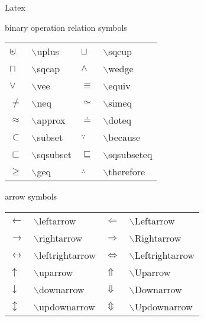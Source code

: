 \begin{section}{Latex}
\begin{subsection}{binary operation relation symbols}
\begin{tabular}{ |m{1cm}|m{3cm}|m{1cm}|m{3cm} | }
			$\uplus$ & $\backslash$uplus &
			$\sqcup$ & $\backslash$sqcup \\
		
			$\sqcap$ & $\backslash$sqcap &
			$\wedge$ & $\backslash$wedge \\
		
			$\vee$ & $\backslash$vee &
			$\equiv$ & $\backslash$equiv \\
		
			$\neq$ & $\backslash$neq &
			$\simeq$ & $\backslash$simeq \\
		
			$\approx$ & $\backslash$approx &
			$\doteq$ & $\backslash$doteq \\
		
			$\subset$ & $\backslash$subset &
			$\because$ & $\backslash$because \\
		
			$\sqsubset$ & $\backslash$sqsubset &
			$\sqsubseteq$ & $\backslash$sqsubseteq \\
		
		
			$\geq$ & $\backslash$geq &
			$\therefore$ & $\backslash$therefore \\
	
		\hline
		\end{tabular}
	
	\end{subsection}

	\begin{subsection}{arrow symbols}
		\begin{tabular}{ |m{1cm}|m{4cm}|m{1cm}|m{4cm} | }
		\hline
		
			$\leftarrow$ & $\backslash$leftarrow &
			$\Leftarrow$ & $\backslash$Leftarrow \\
		
			$\rightarrow$ & $\backslash$rightarrow &
			$\Rightarrow$ & $\backslash$Rightarrow \\
		
			$\leftrightarrow$ & $\backslash$leftrightarrow &
			$\Leftrightarrow$ & $\backslash$Leftrightarrow \\
		
			$\uparrow$ & $\backslash$uparrow &
			$\Uparrow$ & $\backslash$Uparrow \\
		
			$\downarrow$ & $\backslash$downarrow &
			$\Downarrow$ & $\backslash$Downarrow \\
		
			$\updownarrow$ & $\backslash$updownarrow &
			$\Updownarrow$ & $\backslash$Updownarrow \\
		

\end{tabular}
\end{subsection}
\end{section}
